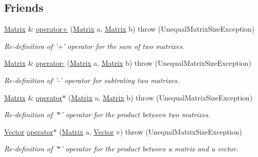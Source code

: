 \subsection*{Friends}
\begin{CompactItemize}
\item 
\hyperlink{classgrassmann_1_1Matrix}{Matrix} \& \hyperlink{classgrassmann_1_1Matrix_696c3e88b7f163ac672b4e5dfaa85693}{operator+} (\hyperlink{classgrassmann_1_1Matrix}{Matrix} a, \hyperlink{classgrassmann_1_1Matrix}{Matrix} b)  throw (UnequalMatrixSizeException)
\begin{CompactList}\small\item\em Re-definition of '+' operator for the sum of two matrixes. \item\end{CompactList}\item 
\hyperlink{classgrassmann_1_1Matrix}{Matrix} \& \hyperlink{classgrassmann_1_1Matrix_1f3e4394cd1517431ae46632f8540c96}{operator-} (\hyperlink{classgrassmann_1_1Matrix}{Matrix} a, \hyperlink{classgrassmann_1_1Matrix}{Matrix} b)  throw (UnequalMatrixSizeException)
\begin{CompactList}\small\item\em Re-definition of '-' operator for subtrating two matrixes. \item\end{CompactList}\item 
\hyperlink{classgrassmann_1_1Matrix}{Matrix} \& \hyperlink{classgrassmann_1_1Matrix_79c865e5316aebc75afcba21bcf102bd}{operator$\ast$} (\hyperlink{classgrassmann_1_1Matrix}{Matrix} a, \hyperlink{classgrassmann_1_1Matrix}{Matrix} b)  throw (UnequalMatrixSizeException)
\begin{CompactList}\small\item\em Re-definition of '$\ast$' operator for the product between two matrixes. \item\end{CompactList}\item 
\hyperlink{classgrassmann_1_1Vector}{Vector} \hyperlink{classgrassmann_1_1Matrix_5366f970d50d2681696cb03ce1df4cef}{operator$\ast$} (\hyperlink{classgrassmann_1_1Matrix}{Matrix} a, \hyperlink{classgrassmann_1_1Vector}{Vector} v)  throw (UnequalMatrixSizeException)
\begin{CompactList}\small\item\em Re-definition of '$\ast$' operator for the product between a matrix and a vector. \item\end{CompactList}\item 

\end{CompactItemize}
